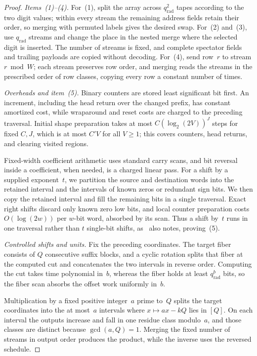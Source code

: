 \begin{proof}
\emph{Items~(1)--(4).}
For~(1), split the array across $q_{\mathrm{rad}}^2$ tapes according to the two digit values; within every stream the remaining address fields retain their order, so merging with permuted labels gives the desired swap. For~(2) and~(3), use $q_{\mathrm{rad}}$ streams and change the place in the nested merge where the selected digit is inserted. The number of streams is fixed, and complete spectator fields and trailing payloads are copied without decoding. For~(4), send row~$r$ to stream $r\bmod W$; each stream preserves row order, and merging reads the streams in the prescribed order of row classes, copying every row a constant number of times.

\emph{Overheads and item~(5).}
Binary counters are stored least significant bit first. An increment, including the head return over the changed prefix, has constant amortized cost, while wraparound and reset costs are charged to the preceding traversal. Initial shape preparation takes at most $C(\log_2(2V))^{J}$ steps for fixed $C,J$, which is at most $C'V$ for all $V\ge1$; this covers counters, head returns, and clearing visited regions.

Fixed-width coefficient arithmetic uses standard carry scans, and bit reversal inside a coefficient, when needed, is a charged linear pass. For a shift by a supplied exponent~$t$, we partition the source and destination words into the retained interval and the intervals of known zeros or redundant sign bits. We then copy the retained interval and fill the remaining bits in a single traversal. Exact right shifts discard only known zero low bits, and local counter preparation costs $O(\log(2w))$ per $w$-bit word, absorbed by its scan. Thus a shift by~$t$ runs in one traversal rather than $t$ single-bit shifts, as~\cite[\S5.4, p.~36]{OAI26} also notes, proving~(5).

\emph{Controlled shifts and units.}
Fix the preceding coordinates. The target fiber consists of $Q$ consecutive suffix blocks, and a cyclic rotation splits that fiber at the computed cut and concatenates the two intervals in reverse order. Computing the cut takes time polynomial in~$b$, whereas the fiber holds at least $q_{\mathrm{rad}}^b$ bits, so the fiber scan absorbs the offset work uniformly in~$b$.

Multiplication by a fixed positive integer~$a$ prime to~$Q$ splits the target coordinates into the at most~$a$ intervals where $x\mapsto ax-kQ$ lies in $[Q]$. On each interval the outputs increase and fall in one residue class modulo~$a$, and those classes are distinct because $\gcd(a,Q)=1$. Merging the fixed number of streams in output order produces the product, while the inverse uses the reversed schedule.


\end{proof}
